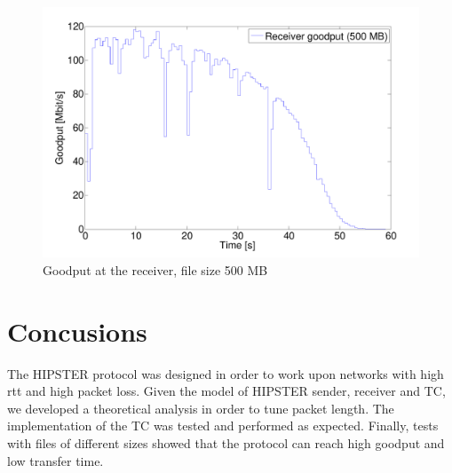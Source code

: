 \documentclass[10pt,twocolumn]{article}
\begin{document}
\begin{figure}[h]
  \centering
  \includegraphics[width = 0.95\columnwidth, keepaspectratio]{tex/images/goodput_c1_500.pdf}
  \caption{Goodput at the receiver, file size 500 MB}
  \label{fig:goodput_500}
\end{figure}

\section{Concusions}
The HIPSTER protocol was designed in order to work upon networks with high rtt and high packet loss. Given the model of HIPSTER sender, receiver and TC, we developed a theoretical analysis in order to tune packet length. The implementation of the TC was tested and performed as expected. Finally, tests with files of different sizes showed that the protocol can reach high goodput and low transfer time.
\end{document}
